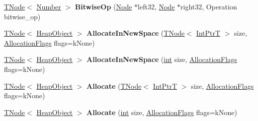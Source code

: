 \begin{DoxyCompactItemize}
\item 
\mbox{\label{classv8_1_1internal_1_1CodeStubAssembler_aa9c613970f82b3892b7d5d405ff31a17}} 
\mbox{\hyperlink{classv8_1_1internal_1_1compiler_1_1TNode}{T\+Node}}$<$ \mbox{\hyperlink{structv8_1_1internal_1_1UnionT}{Number}} $>$ {\bfseries Bitwise\+Op} (\mbox{\hyperlink{classv8_1_1internal_1_1compiler_1_1Node}{Node}} $\ast$left32, \mbox{\hyperlink{classv8_1_1internal_1_1compiler_1_1Node}{Node}} $\ast$right32, Operation bitwise\+\_\+op)
\item 
\mbox{\label{classv8_1_1internal_1_1CodeStubAssembler_a73a77fcdca3dd6ef3256db5f5ea9d70a}} 
\mbox{\hyperlink{classv8_1_1internal_1_1compiler_1_1TNode}{T\+Node}}$<$ \mbox{\hyperlink{classv8_1_1internal_1_1HeapObject}{Heap\+Object}} $>$ {\bfseries Allocate\+In\+New\+Space} (\mbox{\hyperlink{classv8_1_1internal_1_1compiler_1_1TNode}{T\+Node}}$<$ \mbox{\hyperlink{structv8_1_1internal_1_1IntPtrT}{Int\+PtrT}} $>$ size, \mbox{\hyperlink{classv8_1_1base_1_1Flags}{Allocation\+Flags}} flags=k\+None)
\item 
\mbox{\label{classv8_1_1internal_1_1CodeStubAssembler_a33bbdd929586390e2d27568d364f4374}} 
\mbox{\hyperlink{classv8_1_1internal_1_1compiler_1_1TNode}{T\+Node}}$<$ \mbox{\hyperlink{classv8_1_1internal_1_1HeapObject}{Heap\+Object}} $>$ {\bfseries Allocate\+In\+New\+Space} (\mbox{\hyperlink{classint}{int}} size, \mbox{\hyperlink{classv8_1_1base_1_1Flags}{Allocation\+Flags}} flags=k\+None)
\item 
\mbox{\label{classv8_1_1internal_1_1CodeStubAssembler_af6cfc4d0be37afc6f77df54188949993}} 
\mbox{\hyperlink{classv8_1_1internal_1_1compiler_1_1TNode}{T\+Node}}$<$ \mbox{\hyperlink{classv8_1_1internal_1_1HeapObject}{Heap\+Object}} $>$ {\bfseries Allocate} (\mbox{\hyperlink{classv8_1_1internal_1_1compiler_1_1TNode}{T\+Node}}$<$ \mbox{\hyperlink{structv8_1_1internal_1_1IntPtrT}{Int\+PtrT}} $>$ size, \mbox{\hyperlink{classv8_1_1base_1_1Flags}{Allocation\+Flags}} flags=k\+None)
\item 
\mbox{\label{classv8_1_1internal_1_1CodeStubAssembler_af4c92deeeb63f2dd89717a6cd5a5476e}} 
\mbox{\hyperlink{classv8_1_1internal_1_1compiler_1_1TNode}{T\+Node}}$<$ \mbox{\hyperlink{classv8_1_1internal_1_1HeapObject}{Heap\+Object}} $>$ {\bfseries Allocate} (\mbox{\hyperlink{classint}{int}} size, \mbox{\hyperlink{classv8_1_1base_1_1Flags}{Allocation\+Flags}} flags=k\+None)

\end{DoxyCompactItemize}
